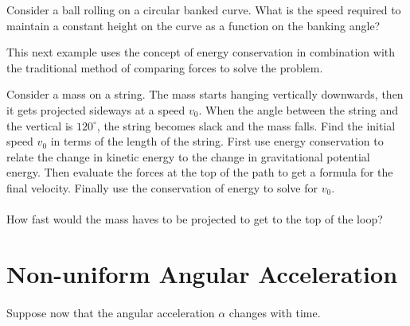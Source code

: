 \documentclass[../classical_mechanics.tex]{subfiles}
\begin{document}
        \begin{example}
            Consider a ball rolling on a circular banked curve.
            What is the speed required to maintain a constant height on the curve as a function on the banking angle?
        \end{example}
        This next example uses the concept of energy conservation in combination with the traditional method of comparing forces to solve the problem.
        \begin{example}
            Consider a mass on a string.
            The mass starts hanging vertically downwards, then it gets projected sideways at a speed $v_0$.
            When the angle between the string and the vertical is $120^\circ$, the string becomes slack and the mass falls.
            Find the initial speed $v_0$ in terms of the length of the string.
            First use energy conservation to relate the change in kinetic energy to the change in gravitational potential energy.
            Then evaluate the forces at the top of the path to get a formula for the final velocity.
            Finally use the conservation of energy to solve for $v_0$.

            \paragraph{}
            How fast would the mass haves to be projected to get to the top of the loop?
        \end{example}

    \section{Non-uniform Angular Acceleration}
        \paragraph{}
        Suppose now that the angular acceleration $\alpha$ changes with time.

\end{document}
